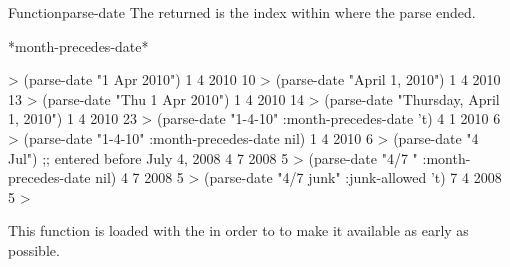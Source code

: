 \documentclass[10pt,twoside,english,pdftex]{article}
\begin{document}
\begin{functiondoc}{Function}{parse-date}
The returned  is the index within  where the
parse ended.

\begin{alsos}{*month-precedes-date*}
\end{alsos}

\fnexamples
%
\W\supp
\begin{example}
  > (parse-date "1 Apr 2010")
  1
  4
  2010
  10
  > (parse-date "April 1, 2010")
  1
  4
  2010
  13
  > (parse-date "Thu 1 Apr 2010")
  1
  4
  2010
  14
  > (parse-date "Thursday, April 1, 2010")
  1
  4
  2010
  23\goodpagebreak
  > (parse-date "1-4-10" :month-precedes-date 't)
  4
  1
  2010
  6
  > (parse-date "1-4-10" :month-precedes-date nil)
  1
  4
  2010
  6\goodpagebreak
  > (parse-date "4 Jul") \textcolor{darkergray}{;; entered before July 4, 2008}
  4
  7
  2008
  5
  > (parse-date "4/7  " :month-precedes-date nil)
  4
  7
  2008
  5\goodpagebreak
  > (parse-date "4/7  junk" :junk-allowed 't)
  7
  4
  2008
  5
  >
\end{example}

\fnnote
{}%
%
%
This function is loaded with the  
in order to to make it available as early as possible.
\end{functiondoc}

\end{document}
